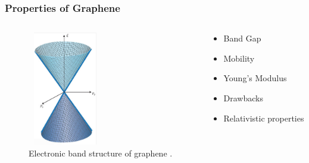 \documentclass{beamer}
\begin{document}
\begin{frame}
\frametitle{Properties of Graphene}
\begin{columns}
	\begin{column}{0.48\textwidth}
	\begin{figure}
		\includegraphics[height=5cm, width=3.25cm]{../present_figs/graphenebandgap}
		\caption{Electronic band structure of graphene \cite{Fuhrer2010}.}
	\end{figure}
	\end{column}
	\begin{column}{0.48\textwidth}
		\begin{itemize}
            \item Band Gap
            \item Mobility
            \item Young's Modulus
            \item Drawbacks
            \item Relativistic properties
        \end{itemize}
	\end{column}
\end{columns}
\end{frame}
\end{document}
